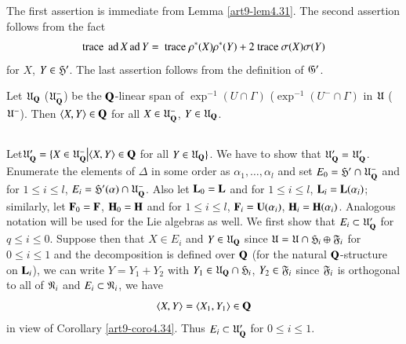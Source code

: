 The first assertion is immediate from Lemma \ref{art9-lem4.31}. The second assertion follows from the fact
$$
\text{trace } \operatorname{ad} X \operatorname{ad} Y = \text{ trace } \rho^\ast (X) \rho^\ast (Y)+ 2 \text{ trace } \sigma (X) \sigma (Y)
$$ 
for $X$, $Y \in \mathfrak{H}'$. The last assertion follows from the definition of $\mathfrak{G}'$.

\begin{proposition}\label{art9-prop4.35}
Let $\mathfrak{U}_{\mathbf{Q}}$ (\resp $\mathfrak{U}^-_{\mathbf{Q}}$) be the $\mathbf{Q}$-linear span of $\exp^{-1} (U \cap \Gamma)$ (\resp $\exp^{-1} (U^- \cap \Gamma)$ in $\mathfrak{U}$ (\resp $\mathfrak{U}^-$). Then $\langle X, Y \rangle \in \mathbf{Q}$ for all $X \in\mathfrak{U}^-_{\mathbf{Q}}$, $Y \in \mathfrak{U}_{\mathbf{Q}}$.
\end{proposition}

\setcounter{subsection}{35}
\subsection{}\label{art9-subsec4.36}
Let\pageoriginale $\mathfrak{U}'_{\mathbf{Q}} = \{X \in \mathfrak{U}^-_{\mathbf{Q}} \big| \langle X, Y \rangle \in \mathbf{Q}$ for all $Y \in \mathfrak{U}_{\mathbf{Q}}\}$. We have to show that $\mathfrak{U}'_{\mathbf{Q}} = \mathfrak{U}'_{\mathbf{Q}}$. Enumerate the elements of $\Delta$ in some order as $\alpha_1, \ldots, \alpha_l$ and set $E_0 = \mathfrak{H}' \cap\mathfrak{U}^-_{\mathbf{Q}}$ and for $1 \leqslant i \leqslant l$, $E_i = \mathfrak{H}'(\alpha) \cap\mathfrak{U}^-_{\mathbf{Q}}$. Also let $\mathbf{L}_0 = \mathbf{L}$ and for $1 \leqslant i \leqslant l$, $\mathbf{L}_i = \mathbf{L}(\alpha_i)$; similarly, let $\mathbf{F}_0 = \mathbf{F}$, $\mathbf{H}_0 = \mathbf{H}$ and for $1 \leqslant i \leqslant l$, $\mathbf{F}_i = \mathbf{U} (\alpha_i)$, $\mathbf{H}_i = \mathbf{H} (\alpha_i)$. Analogous notation will be used for the Lie algebras as well. We first show that $E_i \subset \mathfrak{U}'_{\mathbf{Q}}$ for $q \leqslant i \leqslant 0$. Suppose then that $X \in E_i$ and $Y \in \mathfrak{U}_{\mathbf{Q}}$ since $\mathfrak{U} = \mathfrak{U} \cap \mathfrak{H}_i \oplus \mathfrak{F}_i$ for $0 \leqslant i \leqslant 1$ and the decomposition is defined over $\mathbf{Q}$ (for the natural $\mathbf{Q}$-structure on $\mathbf{L}_i$), we can write $Y = Y_1 + Y_2$ with $Y_1 \in \mathfrak{U}_{\mathbf{Q}} \cap \mathfrak{H}_i$, $Y_2 \in \mathfrak{F}_i$ since $\mathfrak{F}_i$ is orthogonal to all of $\mathfrak{N}_i$ and $E_i \subset \mathfrak{N}_i$, we have
$$
\langle X, Y \rangle = \langle X_1 , Y_1\rangle \in \mathbf{Q}
$$
in view of Corollary \ref{art9-coro4.34}. Thus $E_i \subset \mathfrak{U}'_{\mathbf{Q}}$ for $0\leqslant i \leqslant 1$.

